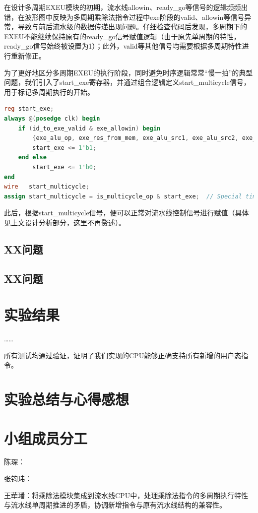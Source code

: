\documentclass[11pt]{article}
\begin{document}
在设计多周期EXEU模块的初期，流水线allowin、ready\_go等信号的逻辑频频出错，在波形图中反映为多周期乘除法指令过程中exe阶段的valid、allowin等信号异常，导致与前后流水级的数据传递出现问题。仔细检查代码后发现，多周期下的EXEU不能继续保持原有的ready\_go信号赋值逻辑（由于原先单周期的特性，ready\_go信号始终被设置为1）；此外，valid等其他信号均需要根据多周期特性进行重新修正。

为了更好地区分多周期EXEU的执行阶段，同时避免时序逻辑常常“慢一拍”的典型问题，我们引入了start\_exe寄存器，并通过组合逻辑定义start\_multicycle信号，用于标记多周期执行的开始。

\begin{lstlisting}[language=verilog]
reg start_exe;
always @(posedge clk) begin
    if (id_to_exe_valid & exe_allowin) begin
        {exe_alu_op, exe_res_from_mem, exe_alu_src1, exe_alu_src2, exe_mem_op, exe_rf_we, exe_rf_waddr, exe_rkd_value, exe_pc} <= id_to_exe_zip;
        start_exe <= 1'b1;
    end else
        start_exe <= 1'b0;
end
wire   start_multicycle;
assign start_multicycle = is_multicycle_op & start_exe;  // Special time stamp
\end{lstlisting}

此后，根据start\_multicycle信号，便可以正常对流水线控制信号进行赋值（具体见上文设计分析部分，这里不再赘述）。

\subsection{XX问题}

\subsection{XX问题}

\section{实验结果}

……

所有测试均通过验证，证明了我们实现的CPU能够正确支持所有新增的用户态指令。

\section{实验总结与心得感想}

\section{小组成员分工}

陈琛：

张钧玮：

王荦璠：将乘除法模块集成到流水线CPU中，处理乘除法指令的多周期执行特性与流水线单周期推进的矛盾，协调新增指令与原有流水线结构的兼容性。
\end{document}
